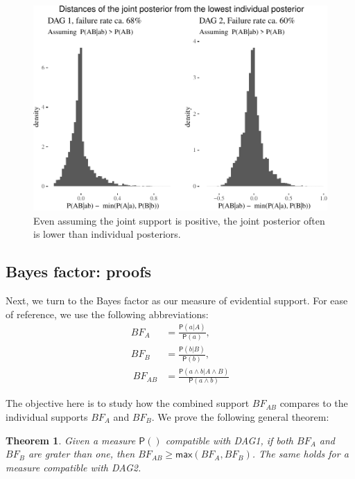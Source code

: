 \documentclass[
  10pt,
  dvipsnames,enabledeprecatedfontcommands]{scrartcl}
\newcommand{\pr}[1]{\ensuremath{\mathsf{P}(#1)}}
\newtheorem{theorem}{Theorem}
\begin{document}
\begin{figure}[H]


\begin{center}\includegraphics[width=0.75\linewidth]{conjunction-appendix14_files/figure-latex/unnamed-chunk-11-1} \end{center}
\caption{Even assuming the joint support is positive, the joint posterior often is lower than individual posteriors.}
\label{fig:posteriorFailure}
\end{figure}

\hypertarget{bayes-factor-proofs}{%
\subsection*{Bayes factor: proofs}\label{bayes-factor-proofs}}

Next, we turn to the Bayes factor as our measure of evidential support.
For ease of reference, we use the following abbreviations:
\begin{align*}
BF_A  & =  \frac{\pr{a \vert A}}{\pr{a}},\\
BF_B & = \frac{\pr{b \vert B}}{\pr{b}},\\\
BF_{AB}  & =  \frac{\pr{a\wedge b \vert A \wedge B}}{\pr{a \wedge b}}
\end{align*}

\noindent The objective here is to study how the combined support
\(BF_{AB}\) compares to the individual supports \(BF_A\) and \(BF_B\).
We prove the following general theorem:

\begin{theorem}
Given a measure $\pr{}$ compatible with \textsf{DAG1}, if both $BF_A$ and $BF_B$ 
are grater than one, then $BF_{AB}\geq \mathsf{max}(BF_{A},BF_{B})$.
The same holds for a measure compatible with \textsf{DAG2}.
\label{thm:aggregationBf}
\end{theorem}
\end{document}
